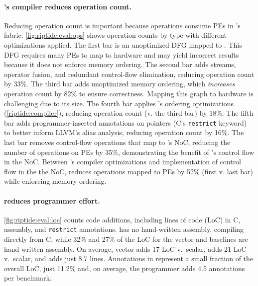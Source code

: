 \paragraph{\riptide's compiler reduces operation count.} Reducing operation count
is important because operations consume PEs in \riptide's fabric.
%
\autoref{fig:riptide:eval:ops} shows operation counts by type with different optimizations applied.
% 
The first bar is an unoptimized DFG mapped to \riptide.
% 
This DFG requires many PEs to map to hardware and may yield incorrect
results because it does not enforce memory ordering.
% 
The second bar adds streams, operator fusion, and redundant control-flow
elimination, reducing operation count by 33\%.
% 
The third bar adds unoptimized memory ordering, which {\em increases} operation count by 82\% to ensure correctness.
% 
Mapping this graph to hardware is challenging due to its size.
% 
The fourth bar applies \riptide's ordering optimizations (\autoref{riptide:compiler}), reducing operation count (v. the third bar) by 18\%.
% 
The fifth bar adds programmer-inserted annotations on pointers (C's {\tt restrict} keyword)
to better inform LLVM's alias analysis, reducing operation count by 16\%.
% 
% 
The last bar removes control-flow operations that map to \riptide's NoC, reducing
the number of operations on PEs by 35\%, demonstrating the benefit of
\riptide's control flow in the NoC.
% 
Between \riptide's compiler optimizations and implementation of control flow in the the NoC, \riptide reduces operations mapped to PEs by 52\% (first v. last bar) while enforcing memory ordering.
% 
\figRipTideLoCResults

\paragraph{\riptide reduces programmer effort.}
\autoref{fig:riptide:eval:loc} counts code additions, including lines of code (LoC) in C, assembly, and {\tt restrict} annotations.  
%
% 
\riptide has no hand-written assembly, compiling directly from C, while  32\% and
27\% of the LoC for the vector and \snafu baselines are hand-written assembly.
% 
On average, vector adds 17 LoC v.\ scalar, \snafu adds 21 LoC v.\ scalar, and
\riptide adds just 8.7 lines.
% 
Annotations in \riptide represent a small fraction of the overall LoC, just 11.2\%
and, on average, the programmer adds 4.5 annotations per benchmark.


